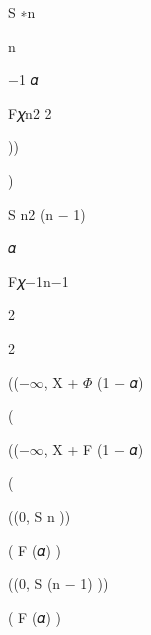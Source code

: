 \documentclass[a4paper,portrait,12pt]{article}
\begin{document}
\begin{flushleft}
S ∗n
\end{flushleft}


\begin{flushleft}
n
\end{flushleft}


\begin{flushleft}
$-$1 𝛼
\end{flushleft}


\begin{flushleft}
F𝜒n2 2
\end{flushleft}





))


)





\begin{flushleft}
S n2 (n $-$ 1)
\end{flushleft}


\begin{flushleft}
𝛼
\end{flushleft}


\begin{flushleft}
F𝜒$-$1n$-$1
\end{flushleft}


2


2





\begin{flushleft}
(($-$$\infty$, X + $\Phi$ (1 $-$ 𝛼)
\end{flushleft}


(


\begin{flushleft}
(($-$$\infty$, X + F (1 $-$ 𝛼)
\end{flushleft}


(


\begin{flushleft}
((0, S n ))
\end{flushleft}


\begin{flushleft}
( F (𝛼) )
\end{flushleft}


\begin{flushleft}
((0, S (n $-$ 1) ))
\end{flushleft}


\begin{flushleft}
( F (𝛼) )
\end{flushleft}
\end{document}
